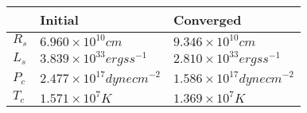 
    \begin{tabular}{l|l|l}
    & Initial & Converged \\ \hline \hline
    $R_s$ & $6.960 \times 10^{10}\unit{cm}$ & $9.346 \times 10^{10}\unit{cm}$ \\
$L_s$ & $3.839 \times 10^{33}\unit{ergs s}^{-1}$ & $2.810 \times 10^{33}\unit{ergs s}^{-1}$ \\
$P_c$ & $2.477 \times 10^{17}\unit{dyne cm}^{-2}$ & $1.586 \times 10^{17}\unit{dyne cm}^{-2}$ \\
$T_c$ & $1.571 \times 10^{7}\unit{K}$ & $1.369 \times 10^{7}\unit{K}$ \\
    \end{tabular}
    